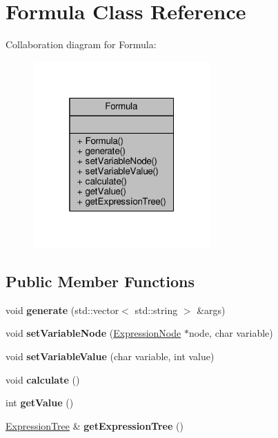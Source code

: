 \hypertarget{classFormula}{}\section{Formula Class Reference}
\label{classFormula}


Collaboration diagram for Formula\+:
\nopagebreak
\begin{figure}[H]
\begin{center}
\leavevmode
\includegraphics[width=193pt]{classFormula__coll__graph}
\end{center}
\end{figure}
\subsection*{Public Member Functions}
\begin{DoxyCompactItemize}
\item 
void {\bfseries generate} (std\+::vector$<$ std\+::string $>$ \&args)\hypertarget{classFormula_aae68f090a158b164ddbb46158e411c54}{}\label{classFormula_aae68f090a158b164ddbb46158e411c54}

\item 
void {\bfseries set\+Variable\+Node} (\hyperlink{classExpressionNode}{Expression\+Node} $\ast$node, char variable)\hypertarget{classFormula_ac6bbb91048c27c3aa69aa8731459b6fd}{}\label{classFormula_ac6bbb91048c27c3aa69aa8731459b6fd}

\item 
void {\bfseries set\+Variable\+Value} (char variable, int value)\hypertarget{classFormula_acc23e4da57c36e2ed75e698ddf77a409}{}\label{classFormula_acc23e4da57c36e2ed75e698ddf77a409}

\item 
void {\bfseries calculate} ()\hypertarget{classFormula_a031a0080a041ebf11c7364059decceca}{}\label{classFormula_a031a0080a041ebf11c7364059decceca}

\item 
int {\bfseries get\+Value} ()\hypertarget{classFormula_a00d976580373a7b44ca0ce4304e404db}{}\label{classFormula_a00d976580373a7b44ca0ce4304e404db}

\item 
\hyperlink{classExpressionTree}{Expression\+Tree} \& {\bfseries get\+Expression\+Tree} ()\hypertarget{classFormula_a2ba89fba606ca10a22f3936601da2f60}{}\label{classFormula_a2ba89fba606ca10a22f3936601da2f60}

\end{DoxyCompactItemize}


